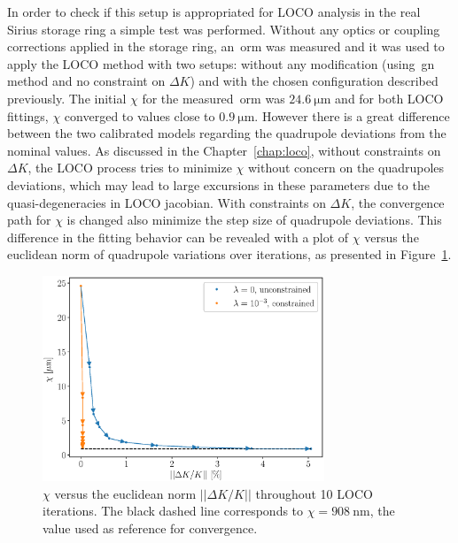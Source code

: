 In order to check if this setup is appropriated for LOCO analysis in the real Sirius storage ring a simple test was performed. Without any optics or coupling corrections applied in the storage ring, an~\gls{orm} was measured and it was used to apply the LOCO method with two setups: without any modification (using~\gls{gn} method and no constraint on $\Delta K$) and with the chosen configuration described previously. The initial $\chi$ for the measured~\gls{orm} was $\SI{24.6}{\micro\meter}$ and for both LOCO fittings, $\chi$ converged to values close to $\SI{0.9}{\micro\meter}$. However there is a great difference between the two calibrated models regarding the quadrupole deviations from the nominal values. As discussed in the Chapter~\ref{chap:loco}, without constraints on $\Delta K$, the LOCO process tries to minimize $\chi$ without concern on the quadrupoles deviations, which may lead to large excursions in these parameters due to the quasi-degeneracies in LOCO jacobian. With constraints on $\Delta K$, the convergence path for $\chi$ is changed also minimize the step size of quadrupole deviations. This difference in the fitting behavior can be revealed with a plot of $\chi$ versus the euclidean norm of quadrupole variations over iterations, as presented in Figure~\ref{fig:chi_vs_dkl}.
\begin{figure}
\centering
\includegraphics[width=0.75\textwidth]{figures/chi_versus_dk.eps}
\caption{$\chi$ versus the euclidean norm $||\Delta K/K||$ throughout 10 LOCO iterations. The black dashed line corresponds to $\chi = \SI{908}{\nano\meter}$, the value used as reference for convergence.}
\label{fig:chi_vs_dkl}
\end{figure}

